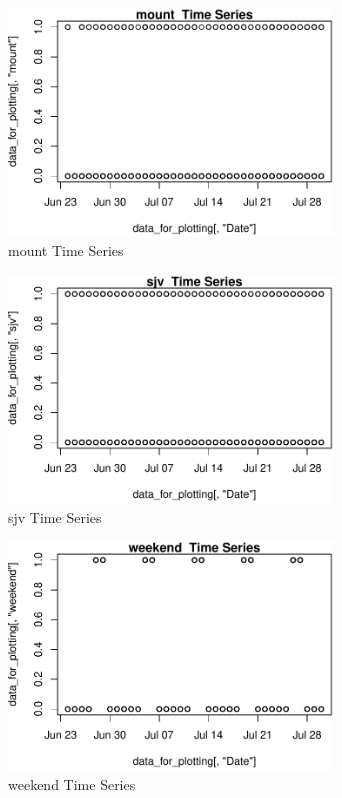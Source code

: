 \begin{figure} 
\centering  
\includegraphics[width=0.77\textwidth]{Code_Outputs/ML_input_report_AllforCaret_cleaned_StepPractice_part_practice_mountTS.pdf} 
\caption{\label{fig:ML_input_report_AllforCaret_cleaned_StepPractice_part_practicemountTS}mount  Time Series} 
\end{figure} 
 

\begin{figure} 
\centering  
\includegraphics[width=0.77\textwidth]{Code_Outputs/ML_input_report_AllforCaret_cleaned_StepPractice_part_practice_sjvTS.pdf} 
\caption{\label{fig:ML_input_report_AllforCaret_cleaned_StepPractice_part_practicesjvTS}sjv  Time Series} 
\end{figure} 
 

\begin{figure} 
\centering  
\includegraphics[width=0.77\textwidth]{Code_Outputs/ML_input_report_AllforCaret_cleaned_StepPractice_part_practice_weekendTS.pdf} 
\caption{\label{fig:ML_input_report_AllforCaret_cleaned_StepPractice_part_practiceweekendTS}weekend  Time Series} 
\end{figure} 
 

